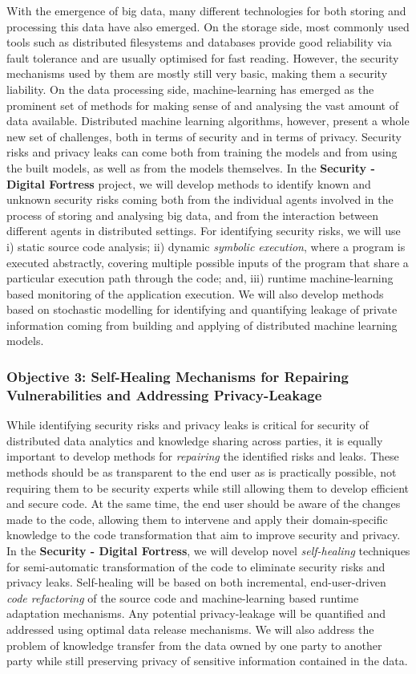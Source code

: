 \documentclass[a4paper,11pt]{article}
\newcommand{\project}[1]{\textbf{#1}\xspace}
\newcommand{\SECURITY}{\project{Security - Digital Fortress}}
\newcommand{\TheProject}{\SECURITY}
\begin{document}
With the emergence of big data, many different technologies for both storing and processing this data have also emerged. On the storage side, most commonly used tools such as distributed filesystems and databases provide good reliability via fault tolerance and are usually optimised for fast reading. However, the security mechanisms used by them are mostly still very basic, making them a security liability. On the data processing side, machine-learning has emerged as the prominent set of methods for making sense of and analysing the vast amount of data available. Distributed machine learning algorithms, however, present a whole new set of challenges, both in terms of security and in terms of privacy. Security risks and privacy leaks can come both from training the models and from using the built models, as well as from the models themselves. In the \TheProject{} project, we will develop methods to identify known and unknown security risks coming both from the individual agents involved in the process of storing and analysing big data, and from the interaction between different agents in distributed settings. For identifying security risks, we will use i) static source code analysis; ii) dynamic \emph{symbolic execution}, where a program is executed abstractly, covering multiple possible inputs of the program that share a particular execution path through the code; and, iii) runtime machine-learning based monitoring of the application execution. We will also develop methods based on stochastic modelling for identifying and quantifying leakage of private information coming from building and applying of distributed machine learning models.

\subsubsection*{Objective 3: Self-Healing Mechanisms for Repairing Vulnerabilities and Addressing Privacy-Leakage}
While identifying security risks and privacy leaks is critical for security of distributed data analytics and knowledge sharing across parties, it is equally important to develop methods for \emph{repairing} the identified risks and leaks. These methods should be as transparent to the end user as is practically possible, not requiring them to be security experts while still allowing them to develop efficient and secure code. At the same time, the end user should be aware of the changes made to the code, allowing them to intervene and apply their domain-specific knowledge to the code transformation that aim to improve security and privacy. In the \TheProject{}, we will develop novel \emph{self-healing} techniques for semi-automatic transformation of the code to eliminate security risks and privacy leaks. Self-healing will be based on both incremental, end-user-driven \emph{code refactoring} of the source code and machine-learning based runtime adaptation mechanisms. Any potential privacy-leakage will be quantified and addressed using optimal data release mechanisms. We will also address the problem of knowledge transfer from the data owned by one party to another party while still preserving privacy of sensitive information contained in the data. 
\end{document}
